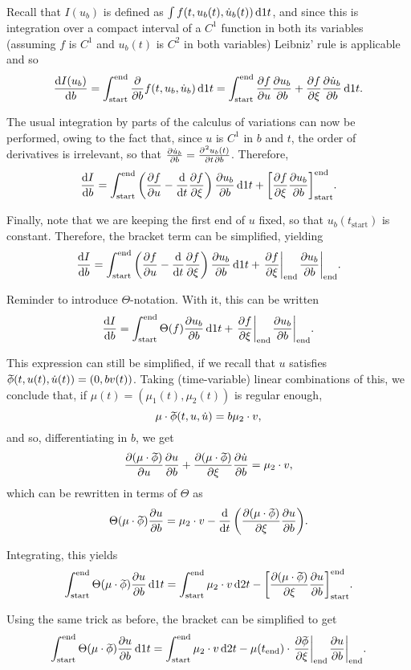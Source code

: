 \documentclass{article}
\theoremstyle{plain}
\theoremstyle{nonumberplain}
\newcommand{\tstart}{\mathrm{start}}
\newcommand{\tend}{\mathrm{end}}
\newcommand{\wtphi}{
  \mspace{2mu}
  \widetilde{\mspace{-2mu}\smash[t]{\phi}}
}
\DeclarePairedDelimiter\eval{.}{\rvert}
\DeclarePairedDelimiter\bracket{[}{]}
\begin{document}
Recall that $I(u_b)$ is defined as $\int f(t, u_b(t), \dot u_b(t)) \dl1 t$, and since this is integration over a compact interval of a $C^1$ function in both its variables (assuming $f$ is $C^1$ and $u_b(t)$ is $C^2$ in both variables) Leibniz' rule is applicable and so
\[\diff{I(u_b)}b = \int_\tstart^\tend \diffp*{f(t, u_b, \dot u_b)}b \dl1 t =\int_\tstart^\tend \diffp f u \diffp{u_b}b + \diffp f \xi \diffp{\dot u_b}b \dl1 t.\]

The usual integration by parts of the calculus of variations can now be performed, owing to the fact that, since $u$ is $C^1$ in $b$ and $t$, the order of derivatives is irrelevant, so that $\diffp{\dot u_b}b = \diffp{u_b(t)}{t,b}$. Therefore,
\[\diff I b = \int_\tstart^\tend \left( \diffp f u - \diff*{\diffp f \xi}t \right) \diffp{u_b}b \dl1 t + \bracket*{ \diffp f \xi \diffp{u_b}b }_\tstart^\tend.\]

Finally, note that we are keeping the first end of $u$ fixed, so that $u_b(t_\tstart)$ is constant. Therefore, the bracket term can be simplified, yielding
\[\diff I b = \int_\tstart^\tend \left( \diffp f u - \diff*{\diffp f \xi}t \right) \diffp{u_b}b \dl1 t + \eval*{\diffp f \xi}_\tend \eval*{\diffp{u_b}b}_\tend.\]

Reminder to introduce $\Theta$-notation. With it, this can be written
\[\diff I b = \int_\tstart^\tend \Theta(f) \diffp{u_b}b \dl1 t + \eval*{\diffp f \xi}_\tend \eval*{\diffp{u_b}b}_\tend.\]

This expression can still be simplified, if we recall that $u$ satisfies $\wtphi(t,u(t), \dot u(t)) = (0, b v(t))$. Taking (time-variable) linear combinations of this, we conclude that, if $\mu(t) = (\mu_1(t), \mu_2(t))$ is regular enough,
\[\mu \cdot \wtphi(t, u, \dot u) = b \mu_2 \cdot v,\]
and so, differentiating in $b$, we get
\[\diffp{(\mu \cdot \wtphi)}u \diffp u b + \diffp{(\mu \cdot \wtphi)}\xi \diffp{\dot u}b = \mu_2 \cdot v,\]
which can be rewritten in terms of $\Theta$ as
\[\Theta(\mu \cdot \wtphi) \diffp u b = \mu_2 \cdot v - \diff*{\left(\diffp{(\mu \cdot \wtphi)}\xi \diffp u b \right)}t.\]

Integrating, this yields
\[\int_\tstart^\tend \Theta(\mu \cdot \wtphi) \diffp u b \dl1 t = \int_\tstart^\tend \mu_2 \cdot v \dl2 t - \bracket*{\diffp{(\mu \cdot \wtphi)}\xi \diffp u b}_\tstart^\tend.\]

Using the same trick as before, the bracket can be simplified to get
\[\int_\tstart^\tend \Theta(\mu \cdot \wtphi) \diffp u b \dl1 t = \int_\tstart^\tend \mu_2 \cdot v \dl2 t - \mu(t_\tend) \cdot \eval*{\diffp{\wtphi}\xi}_\tend \eval*{\diffp u b}_\tend.\]
\end{document}

